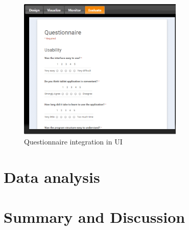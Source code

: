 \begin{figure}[H]
\centering
\includegraphics[width=0.7\textwidth]{../thesis/assets/questionnaire_integration.png}
\caption[Questionnaire integration in UI]{Questionnaire integration in UI}
\label{fig:ui_evaluate}
\end{figure}

\section{Data analysis}

\section{Summary and Discussion}